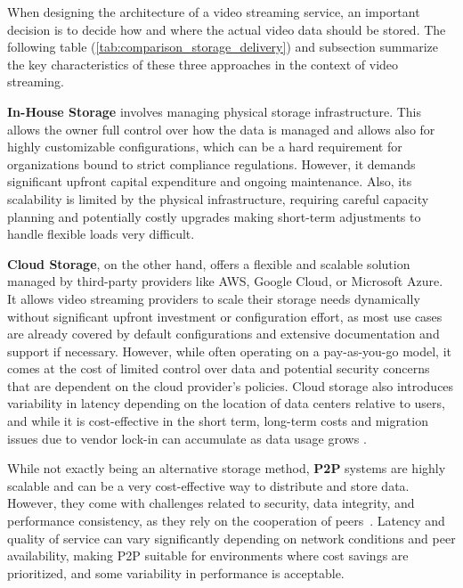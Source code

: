 When designing the architecture of a video streaming service, an important decision is to decide how and where the actual video data should be stored. The following table (\autoref{tab:comparison_storage_delivery}) and subsection summarize the key characteristics of these three approaches in the context of video streaming. 

\textbf{In-House Storage} involves managing physical storage infrastructure. This allows the owner full control over how the data is managed and allows also for highly customizable configurations, which can be a hard requirement for organizations bound to strict compliance regulations. However, it demands significant upfront capital expenditure and ongoing maintenance. Also, its scalability is limited by the physical infrastructure, requiring careful capacity planning and potentially costly upgrades making short-term adjustments to handle flexible loads very difficult. 

\textbf{Cloud Storage}, on the other hand, offers a flexible and scalable solution managed by third-party providers like AWS, Google Cloud, or Microsoft Azure. It allows video streaming providers to scale their storage needs dynamically without significant upfront investment or configuration effort, as most use cases are already covered by default configurations and extensive documentation and support if necessary. However, while often operating on a pay-as-you-go model, it comes at the cost of limited control over data and potential security concerns that are dependent on the cloud provider's policies. Cloud storage also introduces variability in latency depending on the location of data centers relative to users, and while it is cost-effective in the short term, long-term costs and migration issues due to vendor lock-in can accumulate as data usage grows \parencite{cloud_streaming_cost}.

While not exactly being an alternative storage method, \textbf{\ac{P2P}} systems are highly scalable and can be a very cost-effective way to distribute and store data. However, they come with challenges related to security, data integrity, and performance consistency, as they rely on the cooperation of peers~\parencite{p2p}. Latency and quality of service can vary significantly depending on network conditions and peer availability, making \ac{P2P} suitable for environments where cost savings are prioritized, and some variability in performance is acceptable.


